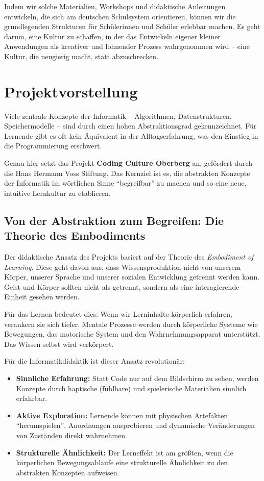 \documentclass[a5paper,pagesize,10pt,bibtotoc,pointlessnumbers,
normalheadings,DIV=9,twoside=false]{scrbook}
\begin{document}
Indem wir solche Materialien, Workshops und didaktische Anleitungen entwickeln, die sich am deutschen Schulsystem orientieren, können wir die grundlegenden Strukturen für Schülerinnen und Schüler erlebbar machen. Es geht darum, eine Kultur zu schaffen, in der das Entwickeln eigener kleiner Anwendungen als kreativer und lohnender Prozess wahrgenommen wird -- eine Kultur, die neugierig macht, statt abzuschrecken.

\section*{Projektvorstellung}

Viele zentrale Konzepte der Informatik -- Algorithmen, Datenstrukturen, Speichermodelle -- sind durch einen hohen Abstraktionsgrad gekennzeichnet. Für Lernende gibt es oft kein Äquivalent in der Alltagserfahrung, was den Einstieg in die Programmierung erschwert.

Genau hier setzt das Projekt \textbf{Coding Culture Oberberg} an, gefördert durch die Hans Hermann Voss Stiftung. Das Kernziel ist es, die abstrakten Konzepte der Informatik im wörtlichen Sinne ``begreifbar'' zu machen und so eine neue, intuitive Lernkultur zu etablieren.

\subsection*{Von der Abstraktion zum Begreifen: Die Theorie des Embodiments}

Der didaktische Ansatz des Projekts basiert auf der Theorie des \textit{Embodiment of Learning}. Diese geht davon aus, dass Wissensproduktion nicht von unserem Körper, unserer Sprache und unserer sozialen Entwicklung getrennt werden kann. Geist und Körper sollten nicht als getrennt, sondern als eine interagierende Einheit gesehen werden.

Für das Lernen bedeutet dies: Wenn wir Lerninhalte körperlich erfahren, verankern sie sich tiefer. Mentale Prozesse werden durch körperliche Systeme wie Bewegungen, das motorische System und den Wahrnehmungsapparat unterstützt. Das Wissen selbst wird verkörpert.

Für die Informatikdidaktik ist dieser Ansatz revolutionär:

\begin{itemize}
    \item \textbf{Sinnliche Erfahrung:} Statt Code nur auf dem Bildschirm zu sehen, werden Konzepte durch haptische (fühlbare) und spielerische Materialien sinnlich erfahrbar.
    \item \textbf{Aktive Exploration:} Lernende können mit physischen Artefakten ``herumspielen'', Anordnungen ausprobieren und dynamische Veränderungen von Zuständen direkt wahrnehmen.
    \item \textbf{Strukturelle Ähnlichkeit:} Der Lerneffekt ist am größten, wenn die körperlichen Bewegungsabläufe eine strukturelle Ähnlichkeit zu den abstrakten Konzepten aufweisen.
\end{itemize}
\end{document}
